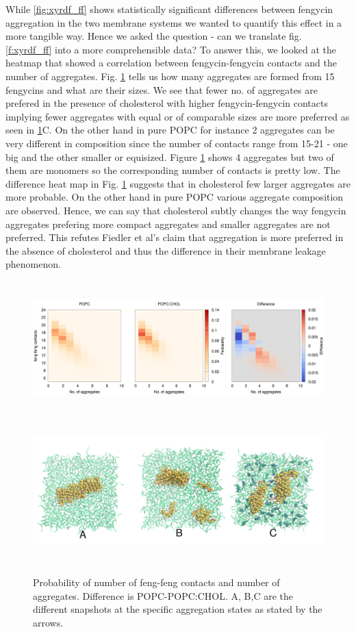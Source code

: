 While \ref{fig:xyrdf_ff} shows statistically significant differences between fengycin 
aggregation in the two membrane systems we wanted to quantify this effect in a more 
tangible way. Hence we asked the question \-- can we translate fig. \ref{f:xyrdf_ff} 
into a more comprehensible data? 
To answer this, we looked at the heatmap that showed a correlation between 
fengycin-fengycin contacts and the number of aggregates. 
Fig. \ref{f:na_ff} tells us how many aggregates are formed from 15 
fengycins and what are their sizes. We see that fewer no. of aggregates 
are prefered in the presence of cholesterol with higher fengycin-fengycin contacts implying fewer aggregates with equal or of comparable sizes are more preferred as seen in \ref{f:na_ff}C. 
On the other hand in pure POPC for instance 2 aggregates can be very different in composition since the number of contacts range from 15-21 \-- one big and 
 the other smaller or equisized. Figure \ref{f:na_ff} shows 4 aggregates but two of them are monomers so the corresponding number of contacts is pretty low. The difference heat map in Fig. 
 \ref{f:na_ff} suggests that in cholesterol few larger aggregates are more probable. On the other hand
 in pure POPC various aggregate composition are observed.  Hence, we can say that cholesterol subtly changes the way fengycin 
 aggregates prefering more compact aggregates and smaller aggregates are not 
 preferred. This refutes Fiedler et al's claim that 
 aggregation is more preferred in the absence of cholesterol and thus the difference 
 in their membrane leakage phenomenon\cite{Heerklotz2015}.

 
\begin{figure}[h!]
    \centering
    \includegraphics[height=2.0in,angle=0,keepaspectratio]{chapter3_figs/na_ff_prob.png}
    \includegraphics[height=2.25in,angle=0,keepaspectratio]{chapter3_figs/aggs_fig.pdf}
\caption{Probability of number of feng-feng contacts and number of aggregates. Difference is POPC-POPC:CHOL. A, B,C are the different snapshots at the specific aggregation states as stated by the arrows.}
\label{f:na_ff}
\end{figure}

